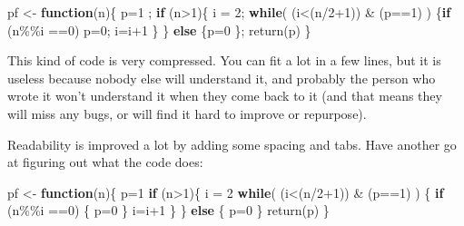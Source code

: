 \documentclass[
]{book}
\newenvironment{Shaded}{\begin{snugshade}}{\end{snugshade}}
\newcommand{\ControlFlowTok}[1]{\textcolor[rgb]{0.13,0.29,0.53}{\textbf{#1}}}
\newcommand{\DecValTok}[1]{\textcolor[rgb]{0.00,0.00,0.81}{#1}}
\newcommand{\FunctionTok}[1]{\textcolor[rgb]{0.00,0.00,0.00}{#1}}
\newcommand{\NormalTok}[1]{#1}
\newcommand{\OtherTok}[1]{\textcolor[rgb]{0.56,0.35,0.01}{#1}}
\newcommand{\SpecialCharTok}[1]{\textcolor[rgb]{0.00,0.00,0.00}{#1}}
\begin{document}
\begin{Shaded}
\begin{Highlighting}[]
\NormalTok{pf }\OtherTok{\textless{}{-}} \ControlFlowTok{function}\NormalTok{(n)\{ p}\OtherTok{=}\DecValTok{1}\NormalTok{ ; }\ControlFlowTok{if}\NormalTok{ (n}\SpecialCharTok{\textgreater{}}\DecValTok{1}\NormalTok{)\{ i }\OtherTok{=} \DecValTok{2}\NormalTok{; }\ControlFlowTok{while}\NormalTok{( (i}\SpecialCharTok{\textless{}}\NormalTok{(n}\SpecialCharTok{/}\DecValTok{2}\SpecialCharTok{+}\DecValTok{1}\NormalTok{)) }\SpecialCharTok{\&}\NormalTok{ (p}\SpecialCharTok{==}\DecValTok{1}\NormalTok{) ) \{}\ControlFlowTok{if}\NormalTok{ (n}\SpecialCharTok{\%\%}\NormalTok{i }\SpecialCharTok{==}\DecValTok{0}\NormalTok{) p}\OtherTok{=}\DecValTok{0}\NormalTok{; i}\OtherTok{=}\NormalTok{i}\SpecialCharTok{+}\DecValTok{1}\NormalTok{ \}  \} }\ControlFlowTok{else}\NormalTok{ \{p}\OtherTok{=}\DecValTok{0}\NormalTok{ \}; }\FunctionTok{return}\NormalTok{(p) \}}
\end{Highlighting}
\end{Shaded}

This kind of code is very compressed. You can fit a lot in a few lines, but it is useless because nobody else will understand it, and probably the person who wrote it won't understand it when they come back to it (and that means they will miss any bugs, or will find it hard to improve or repurpose).

Readability is improved a lot by adding some spacing and tabs. Have another go at figuring out what the code does:

\begin{Shaded}
\begin{Highlighting}[]
\NormalTok{pf }\OtherTok{\textless{}{-}} \ControlFlowTok{function}\NormalTok{(n)\{}
\NormalTok{  p}\OtherTok{=}\DecValTok{1}
  \ControlFlowTok{if}\NormalTok{ (n}\SpecialCharTok{\textgreater{}}\DecValTok{1}\NormalTok{)\{ }
\NormalTok{    i }\OtherTok{=} \DecValTok{2} 
      \ControlFlowTok{while}\NormalTok{( (i}\SpecialCharTok{\textless{}}\NormalTok{(n}\SpecialCharTok{/}\DecValTok{2}\SpecialCharTok{+}\DecValTok{1}\NormalTok{)) }\SpecialCharTok{\&}\NormalTok{ (p}\SpecialCharTok{==}\DecValTok{1}\NormalTok{) ) \{}
        \ControlFlowTok{if}\NormalTok{ (n}\SpecialCharTok{\%\%}\NormalTok{i }\SpecialCharTok{==}\DecValTok{0}\NormalTok{) \{}
\NormalTok{          p}\OtherTok{=}\DecValTok{0}
\NormalTok{        \}}
\NormalTok{        i}\OtherTok{=}\NormalTok{i}\SpecialCharTok{+}\DecValTok{1}
\NormalTok{      \}}
\NormalTok{  \} }\ControlFlowTok{else}\NormalTok{ \{}
\NormalTok{    p}\OtherTok{=}\DecValTok{0}
\NormalTok{  \}}
  \FunctionTok{return}\NormalTok{(p)}
\NormalTok{\}}
\end{Highlighting}
\end{Shaded}
\end{document}
